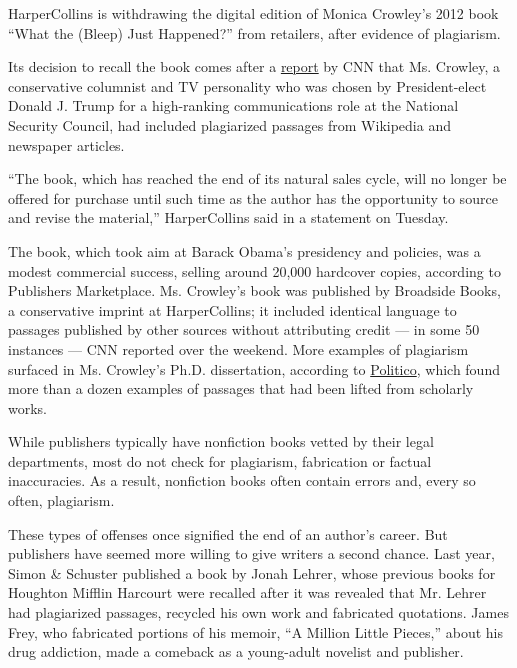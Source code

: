 HarperCollins is withdrawing the digital edition of Monica Crowley's
2012 book ``What the (Bleep) Just Happened?'' from retailers, after
evidence of plagiarism.

Its decision to recall the book comes after a
\href{http://money.cnn.com/interactive/news/kfile-trump-monica-crowley-plagiarized-multiple-sources-2012-book/?sr=fbmoney010717kfile-trump-monica-crowley-plagiarized-multiple-sources-2012-book0531PMStoryLink\&linkId=33126237\&sr=twCNN010717/?sr=fbmoney010717kfile}{report}
by CNN that Ms. Crowley, a conservative columnist and TV personality who
was chosen by President-elect Donald J. Trump for a high-ranking
communications role at the National Security Council, had included
plagiarized passages from Wikipedia and newspaper articles.

``The book, which has reached the end of its natural sales cycle, will
no longer be offered for purchase until such time as the author has the
opportunity to source and revise the material,'' HarperCollins said in a
statement on Tuesday.

The book, which took aim at Barack Obama's presidency and policies, was
a modest commercial success, selling around 20,000 hardcover copies,
according to Publishers Marketplace. Ms. Crowley's book was published by
Broadside Books, a conservative imprint at HarperCollins; it included
identical language to passages published by other sources without
attributing credit --- in some 50 instances --- CNN reported over the
weekend. More examples of plagiarism surfaced in Ms. Crowley's Ph.D.
dissertation, according to
\href{http://www.politico.com/magazine/story/2017/01/monica-crowley-plagiarism-phd-dissertation-columbia-214612}{Politico},
which found more than a dozen examples of passages that had been lifted
from scholarly works.

While publishers typically have nonfiction books vetted by their legal
departments, most do not check for plagiarism, fabrication or factual
inaccuracies. As a result, nonfiction books often contain errors and,
every so often, plagiarism.

These types of offenses once signified the end of an author's career.
But publishers have seemed more willing to give writers a second chance.
Last year, Simon \& Schuster published a book by Jonah Lehrer, whose
previous books for Houghton Mifflin Harcourt were recalled after it was
revealed that Mr. Lehrer had plagiarized passages, recycled his own work
and fabricated quotations. James Frey, who fabricated portions of his
memoir, ``A Million Little Pieces,'' about his drug addiction, made a
comeback as a young-adult novelist and publisher.


